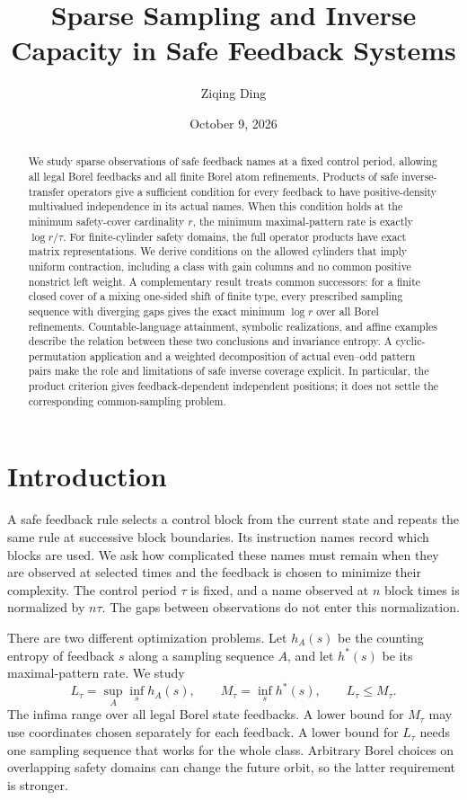 \documentclass[11pt,reqno]{amsart}
\title[Sparse sampling and inverse capacity]{Sparse Sampling and Inverse Capacity in Safe Feedback Systems}
\author{Ziqing Ding}
\date{October 9, 2026}
\numberwithin{equation}{section}
\theoremstyle{definition}
\begin{document}
\begin{abstract}
We study sparse observations of safe feedback names at a fixed control
period, allowing all legal Borel feedbacks and all finite Borel atom
refinements. Products of safe inverse-transfer operators give a
sufficient condition for every feedback to have positive-density
multivalued independence in its actual names. When this condition holds
at the minimum safety-cover cardinality $r$, the minimum maximal-pattern
rate is exactly $\log r/\tau$. For finite-cylinder safety domains, the
full operator products have exact matrix representations. We derive
conditions on the allowed cylinders that imply uniform contraction,
including a class with gain columns and no common positive nonstrict
left weight. A complementary result treats common successors: for a
finite closed cover of a mixing one-sided shift of finite type, every
prescribed sampling sequence with diverging gaps gives the exact minimum
$\log r$ over all Borel refinements. Countable-language attainment,
symbolic realizations, and affine examples describe the relation between
these two conclusions and invariance entropy. A cyclic-permutation
application and a weighted decomposition of actual even--odd pattern
pairs make the role and limitations of safe inverse coverage explicit. In particular, the
product criterion gives feedback-dependent independent positions; it
does not settle the corresponding common-sampling problem.
\end{abstract}
\maketitle
\tableofcontents

\section{Introduction}\label{sec:intro}

A safe feedback rule selects a control block from the current state and
repeats the same rule at successive block boundaries. Its instruction
names record which blocks are used. We ask how complicated these names
must remain when they are observed at selected times and the feedback
is chosen to minimize their complexity. The control period $\tau$ is
fixed, and a name observed at $n$ block times is normalized by $n\tau$.
The gaps between observations do not enter this normalization.

There are two different optimization problems. Let $h_A(s)$ be the
counting entropy of feedback $s$ along a sampling sequence $A$, and let
$h^*(s)$ be its maximal-pattern rate. We study
\[
 L_\tau=\sup_A\inf_s h_A(s),\qquad
 M_\tau=\inf_s h^*(s),\qquad L_\tau\le M_\tau.
\]
The infima range over all legal Borel state feedbacks. A lower bound for
$M_\tau$ may use coordinates chosen separately for each feedback. A
lower bound for $L_\tau$ needs one sampling sequence that works for the
whole class. Arbitrary Borel choices on overlapping safety domains can
change the future orbit, so the latter requirement is stronger.
\end{document}

